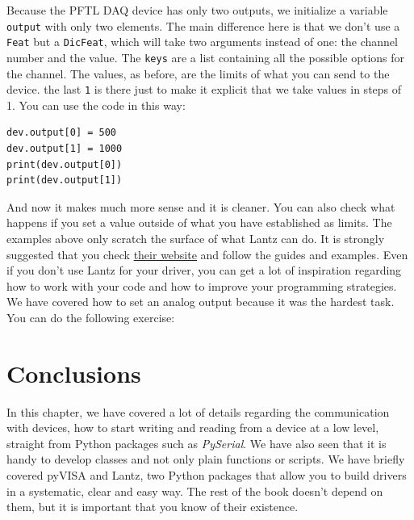Because the {PFTL DAQ} device has only two outputs, we initialize a
variable \texttt{output} with only two elements. The main difference
here is that we don't use a \texttt{Feat} but a \texttt{DicFeat}, which
will take two arguments instead of one: the channel number and the
value. The \texttt{keys} are a list containing all the possible options
for the channel. The
values, as before, are the limits of what you can send to the device. 
the last \texttt{1} is there just to make it explicit that we take
values in steps of 1. You can use the code in this way:

\begin{verbatim}
dev.output[0] = 500
dev.output[1] = 1000
print(dev.output[0])
print(dev.output[1])
\end{verbatim}

And now it makes much more sense and it is cleaner. You can also check
what happens if you set a value outside of what you have established as
limits. The examples above only scratch the surface of what Lantz can
do. It is strongly suggested that you check
\href{http://lantz.readthedocs.io}{their website} and follow the guides
and examples. Even if you don't use Lantz for your driver, you can get a
lot of inspiration regarding how to work with your code and how to
improve your programming strategies. We have covered how to set an
analog output because it was the hardest task. You can do the
following exercise:



\section{Conclusions}\label{section:conclusions}
In this chapter, we have covered a lot of details regarding the
communication with devices, how to start writing and reading from a
device at a low level, straight from Python packages such as
\emph{PySerial}. We have also seen that it is handy to develop classes
and not only plain functions or scripts. We have briefly covered pyVISA and Lantz,
two Python packages that allow you to build drivers in a systematic, clear
and easy way. The rest of the book doesn't depend on them, but it is important that you know of their existence. 

